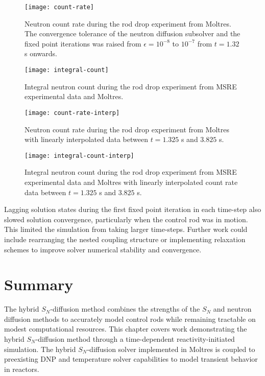 \begin{figure}[p]
  \centering
  \texttt{[image: count-rate]}
  \caption{Neutron count rate during the rod drop experiment from Moltres. The convergence tolerance
  of the neutron diffusion subsolver and the fixed point iterations was raised from $\epsilon=10^{-8}$
  to $10^{-7}$ from $t=1.32$ s onwards.}
  \label{fig:count-rate}
  \texttt{[image: integral-count]}
  \caption{Integral neutron count during the rod drop experiment from \gls{MSRE} experimental data
  and Moltres.}
  \label{fig:integral-count}
\end{figure}

\begin{figure}[p]
  \centering
  \texttt{[image: count-rate-interp]}
  \caption{Neutron count rate during the rod drop experiment from Moltres with linearly interpolated
    data between $t=1.325$ s and $3.825$ s.}
  \label{fig:count-rate-interp}
  \texttt{[image: integral-count-interp]}
  \caption{Integral neutron count during the rod drop experiment from \gls{MSRE} experimental data
  and Moltres with linearly interpolated count rate data between $t=1.325$ s and $3.825$ s.}
  \label{fig:integral-count-interp}
\end{figure}

Lagging solution states during the first fixed point iteration in each time-step also slowed
solution convergence, particularly when the control rod was in motion. This limited the simulation
from taking larger time-steps. Further work could include rearranging the nested coupling structure
or implementing relaxation schemes to improve solver numerical stability and convergence.

\FloatBarrier

\section{Summary} \label{sec:transient-summary}

The hybrid $S_N$-diffusion method combines the strengths of the $S_N$ and neutron
diffusion methods to accurately model control rods while remaining tractable on modest computational
resources. This chapter covers work demonstrating the hybrid $S_N$-diffusion method through a
time-dependent reactivity-initiated simulation. The hybrid $S_N$-diffusion solver implemented in
Moltres is coupled to preexisting \gls{DNP} and temperature solver capabilities to model
transient behavior in reactors.

